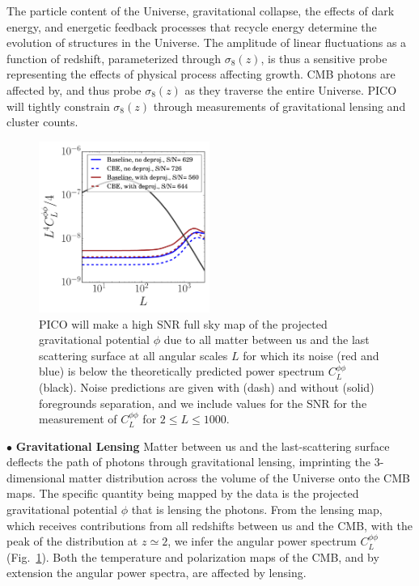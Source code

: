 \documentclass[PICOReport.tex]{subfiles}
\begin{document}
The particle content of the Universe, gravitational collapse, the effects of dark energy, and energetic feedback processes that recycle energy determine the evolution of structures in the Universe. The amplitude of linear fluctuations as a function of redshift, parameterized through $\sigma_8(z)$, is thus a sensitive probe representing the effects of physical process affecting growth. \ac{CMB} photons are affected by, and thus probe $\sigma_{8}(z)$ as they traverse the entire Universe. PICO will tightly constrain $\sigma_8(z)$ through measurements of gravitational lensing and cluster counts. 
\begin{figure}
\hspace{-0.2in}
\parbox{3.0in}{\centerline {
\includegraphics[width=2.2in]{images/lensingNoisePICO.pdf} } }
\hspace{0.in}
\parbox{3.3in}{
\caption{\captiontext 
PICO will make a high \ac{SNR} full sky map of the projected gravitational potential $\phi$ due to all matter between us and the last scattering surface at all angular scales $L$ for which its noise (red and blue) is below the 
theoretically predicted power spectrum $C_{L}^{\phi \phi}$ (black). Noise predictions are given with (dash) and without (solid) foregrounds separation, and we include values for the \ac{SNR} for the measurement of $C_{L}^{\phi \phi}$ for 
$2 \leq L \leq 1000$. 
\label{fig:lensingNoisePICO} 
} }
\vspace{-0.1in}
\end{figure}

\noindent$\bullet$ {\bf Gravitational Lensing} \hspace{0.1in} \label{lensing} Matter between us and the last-scattering surface deflects the path of photons through gravitational lensing, imprinting the 3-dimensional matter distribution across the volume of the Universe onto the CMB maps. The specific quantity being mapped by the data is the projected gravitational potential $\phi$ that is lensing the photons. From the lensing map, which receives contributions from all redshifts between us and the CMB, with the peak of the distribution at $z \simeq 2$, we infer the angular power spectrum $C_{L}^{\phi \phi}$ (Fig.~\ref{fig:lensingNoisePICO}). Both the temperature and polarization maps of the CMB, and by extension the angular power spectra, are affected by lensing. 
\end{document}
